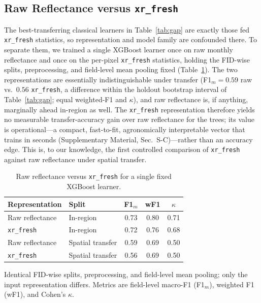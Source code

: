 \documentclass[preprint,authoryear]{elsarticle}
\begin{document}
\subsection{Raw Reflectance versus \texttt{xr\_fresh}}
\label{sec:repr}
The best-transferring classical learners in Table~\ref{tab:gap} are exactly those fed \texttt{xr\_fresh} statistics, so representation and model family are confounded there. To separate them, we trained a single XGBoost learner once on raw monthly reflectance and once on the per-pixel \texttt{xr\_fresh} statistics, holding the FID-wise splits, preprocessing, and field-level mean pooling fixed (Table~\ref{tab:repr}). The two representations are essentially indistinguishable under transfer (F1$_m=0.59$ raw vs.\ $0.56$ \texttt{xr\_fresh}, a difference within the holdout bootstrap interval of Table~\ref{tab:gap}; equal weighted-F1 and $\kappa$), and raw reflectance is, if anything, marginally ahead in-region as well. The \texttt{xr\_fresh} representation therefore yields no measurable transfer-accuracy gain over raw reflectance for the trees; its value is operational---a compact, fast-to-fit, agronomically interpretable vector that trains in seconds (Supplementary Material, Sec.~S-C)---rather than an accuracy edge. This is, to our knowledge, the first controlled comparison of \texttt{xr\_fresh} against raw reflectance under spatial transfer.

\begin{table}[!t]
\centering
\caption{Raw reflectance versus \texttt{xr\_fresh} for a single fixed XGBoost learner.}
\label{tab:repr}
\renewcommand{\arraystretch}{1.1}
\setlength{\tabcolsep}{6pt}
\footnotesize
\begin{tabular}{llccc}
\toprule
\textbf{Representation} & \textbf{Split} & \textbf{F1$_m$} & \textbf{wF1} & \textbf{$\kappa$} \\
\midrule
Raw reflectance    & In-region        & 0.73 & 0.80 & 0.71 \\
\texttt{xr\_fresh} & In-region        & 0.72 & 0.76 & 0.68 \\
\midrule
Raw reflectance    & Spatial transfer & 0.59 & 0.69 & 0.50 \\
\texttt{xr\_fresh} & Spatial transfer & 0.56 & 0.69 & 0.50 \\
\bottomrule
\end{tabular}
\par\vspace{3pt}
\begin{minipage}{\linewidth}
\footnotesize
Identical FID-wise splits, preprocessing, and field-level mean pooling; only the input representation differs. Metrics are field-level macro-F1 (F1$_m$), weighted F1 (wF1), and Cohen's $\kappa$.
\end{minipage}
\end{table}
\end{document}
